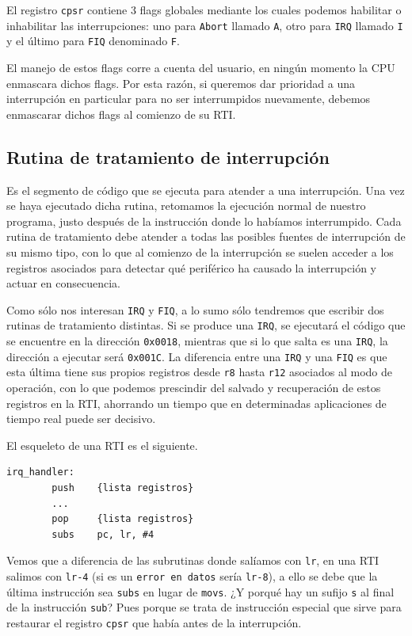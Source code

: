 El registro {\tt cpsr} contiene 3 flags globales mediante los cuales podemos habilitar o
inhabilitar las interrupciones: uno para {\tt Abort} llamado {\tt A}, otro para
{\tt IRQ} llamado {\tt I} y el último para {\tt FIQ} denominado {\tt F}.

El manejo de estos flags corre a cuenta del usuario, en ningún momento la CPU enmascara
dichos flags. Por esta razón, si queremos dar prioridad a una interrupción en particular
para no ser interrumpidos nuevamente, debemos enmascarar dichos flags al comienzo de su RTI.

\subsection{Rutina de tratamiento de interrupción}

Es el segmento de código que se ejecuta para atender a una interrupción. Una vez se haya
ejecutado dicha rutina, retomamos la ejecución normal de nuestro programa, justo después de la instrucción
donde lo habíamos interrumpido. Cada rutina de tratamiento debe atender a todas las posibles
fuentes de interrupción de su mismo tipo, con lo que al comienzo de la interrupción se suelen
acceder a los registros asociados para detectar qué periférico ha causado la interrupción y
actuar en consecuencia.

Como sólo nos interesan {\tt IRQ} y {\tt FIQ}, a lo sumo sólo tendremos que escribir dos
rutinas de tratamiento distintas. Si se produce una {\tt IRQ}, se ejecutará el código
que se encuentre en la dirección {\tt 0x0018}, mientras que si lo que salta es una {\tt IRQ},
la dirección a ejecutar será {\tt 0x001C}. La diferencia entre una {\tt IRQ} y una
{\tt FIQ} es que esta última tiene sus propios registros desde {\tt r8} hasta {\tt r12}
asociados al modo de operación, con lo que podemos prescindir del salvado y recuperación
de estos registros en la RTI, ahorrando un tiempo que en determinadas aplicaciones de
tiempo real puede ser decisivo.

El esqueleto de una RTI es el siguiente.

\begin{lstlisting}
irq_handler:
        push    {lista registros}
        ...
        pop     {lista registros}
        subs    pc, lr, #4
\end{lstlisting}

Vemos que a diferencia de las subrutinas donde salíamos con {\tt lr}, en una RTI salimos
con {\tt lr-4} (si es un {\tt error en datos} sería {\tt lr-8}), a ello se debe que la última
instrucción sea {\tt subs} en lugar de {\tt movs}.
¿Y porqué hay un sufijo {\tt s} al final
de la instrucción {\tt sub}? Pues porque se trata de instrucción especial que sirve para
restaurar el registro {\tt cpsr} que había antes de la interrupción.

